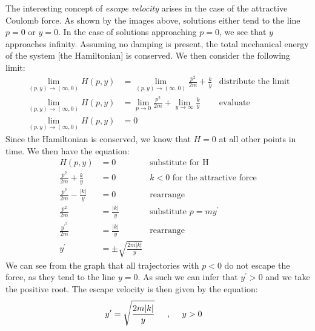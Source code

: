 \documentclass[12pt]{article}
\begin{document}
	\indent The interesting concept of \textit{escape velocity} arises in the case of the attractive Coulomb force. As shown by the images above, solutions either tend to the line $p=0$ or $y=0$. In the case of solutions approaching $p=0$, we see that $y$ approaches infinity. Assuming no damping is present, the total mechanical energy of the system [the Hamiltonian] is conserved. We then consider the following limit:
	\begin{align*}
	\lim_{(p,y)\rightarrow(\infty,0)}H(p,y)&=\lim_{(p,y)\rightarrow(\infty,0)}\frac{p^2}{2m}+\frac{k}{y}&\text{distribute the limit}
	\\
	\lim_{(p,y)\rightarrow(\infty,0)}H(p,y)&=\lim_{p\rightarrow 0}\frac{p^2}{2m}+\lim_{y\rightarrow\infty}\frac{k}{y} &\text{evaluate}
	\\
	\lim_{(p,y)\rightarrow(\infty,0)}H(p,y)&=0
	\end{align*}
	\indent Since the Hamiltonian is conserved, we know that $H=0$ at all other points in time. We then have the equation:
	\begin{align*}
	H(p,y)&=0&\text{substitute for H}
	\\
	\frac{p^2}{2m}+\frac{k}{y}&=0&\text{$k<0$ for the attractive force}
	\\
	\frac{p^2}{2m}-\frac{|k|}{y}&=0&\text{rearrange}
	\\
	\frac{p^2}{2m}&=\frac{|k|}{y}&\text{substitute $p=my^\prime$}
	\\
	\frac{y^{\prime^2}}{2m}&=\frac{|k|}{y}&\text{rearrange}
	\\
	y^{\prime}&=\pm\sqrt{\frac{2m|k|}{y}}
	\end{align*}
	We can see from the graph that all trajectories with $p<0$ do not escape the force, as they tend to the line $y=0$. As such we can infer that $y^\prime>0$ and we take the positive root. The escape velocity is then given by the equation: 
	\begin{align*}
	y^{\prime}&=\sqrt{\frac{2m|k|}{y}}  \text{ \hspace{4mm},\hspace{4mm} $y>0$}
	\end{align*}
	
	\clearpage
	
\end{document}
